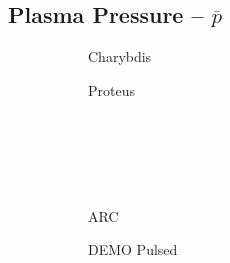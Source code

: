 \clearpage

\newpage

\subsection*{ Plasma Pressure -- $\overline p$ }
  \label{subsection:scan_p_bar}

\begin{figure*}[h!]
    \centering
    \hfill
    \begin{subfigure}[t]{0.45\textwidth}
        \centering
    \begin{adjustbox}{width=\textwidth}
      \Large
      
    \end{adjustbox}
        \caption{Charybdis}
    \end{subfigure}
    \hfill
    \begin{subfigure}[t]{0.45\textwidth}
        \centering
    \begin{adjustbox}{width=\textwidth}
      \Large
      
    \end{adjustbox}
        \caption{Proteus}
    \end{subfigure}
    \hfill \hfill ~\\ ~\\ ~\\ ~\\
    \hfill
    \begin{subfigure}[t]{0.45\textwidth}
        \centering
    \begin{adjustbox}{width=\textwidth}
      \Large
      
    \end{adjustbox}
        \caption{ARC}
    \end{subfigure}
    \hfill
    \begin{subfigure}[t]{0.45\textwidth}
        \centering
    \begin{adjustbox}{width=\textwidth}
      \Large
      
    \end{adjustbox}
        \caption{DEMO Pulsed}
    \end{subfigure}
    \hfill \hfill ~\\ ~\\ ~\\ ~\\
    \hfill
    \begin{subfigure}[t]{0.45\textwidth}
        \centering
    \begin{adjustbox}{width=\textwidth}

\end{adjustbox}
\end{subfigure}
\end{figure*}
